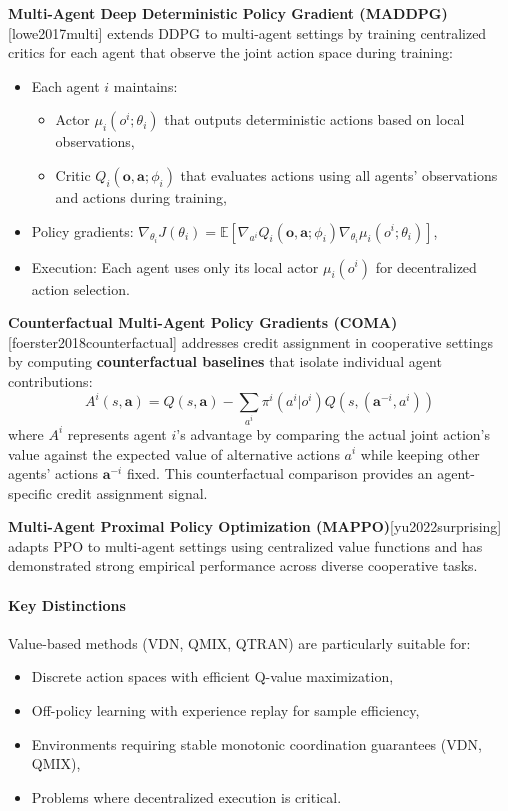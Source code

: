 \textbf{Multi-Agent Deep Deterministic Policy Gradient (MADDPG)}[lowe2017multi] extends DDPG to multi-agent settings by training centralized critics for each agent that observe the joint action space during training:
\begin{itemize}
    \item Each agent $i$ maintains:
    \begin{itemize}
        \item Actor $\mu_i(o^i; \theta_i)$ that outputs deterministic actions based on local observations,
        \item Critic $Q_i(\mathbf{o}, \mathbf{a}; \phi_i)$ that evaluates actions using all agents' observations and actions during training,
    \end{itemize}
    \item Policy gradients: $\nabla_{\theta_i} J(\theta_i) = \mathbb{E} \left[ \nabla_{a^i} Q_i(\mathbf{o}, \mathbf{a}; \phi_i) \nabla_{\theta_i} \mu_i(o^i; \theta_i) \right]$,
    \item Execution: Each agent uses only its local actor $\mu_i(o^i)$ for decentralized action selection.
\end{itemize}

\textbf{Counterfactual Multi-Agent Policy Gradients (COMA)}[foerster2018counterfactual] addresses credit assignment in cooperative settings by computing \textbf{counterfactual baselines} that isolate individual agent contributions:
\[
A^i(s, \mathbf{a}) = Q(s, \mathbf{a}) - \sum_{a^i} \pi^i(a^i | o^i) Q(s, (\mathbf{a}^{-i}, a^i))
\]
where $A^i$ represents agent $i$'s advantage by comparing the actual joint action's value against the expected value of alternative actions $a^i$ while keeping other agents' actions $\mathbf{a}^{-i}$ fixed. This counterfactual comparison provides an agent-specific credit assignment signal.

\textbf{Multi-Agent Proximal Policy Optimization (MAPPO)}[yu2022surprising] adapts PPO to multi-agent settings using centralized value functions and has demonstrated strong empirical performance across diverse cooperative tasks.

\paragraph{Key Distinctions}

Value-based methods (VDN, QMIX, QTRAN) are particularly suitable for:
\begin{itemize}
    \item Discrete action spaces with efficient Q-value maximization,
    \item Off-policy learning with experience replay for sample efficiency,
    \item Environments requiring stable monotonic coordination guarantees (VDN, QMIX),
    \item Problems where decentralized execution is critical.
\end{itemize}

